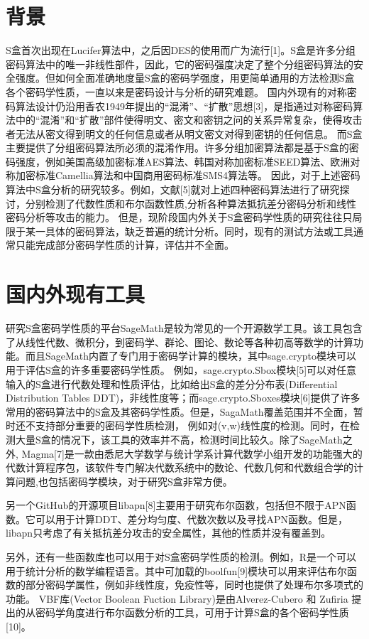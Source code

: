 \documentclass{xduugthesis}
\begin{document}
\section{背景}
S盒首次出现在Lucifer算法中，之后因DES的使用而广为流行[1]。S盒是许多分组密码算法中的唯一非线性部件，因此，它的密码强度决定了整个分组密码算法的安全强度。但如何全面准确地度量S盒的密码学强度，用更简单通用的方法检测S盒各个密码学性质，一直以来是密码设计与分析的研究难题。
国内外现有的对称密码算法设计仍沿用香农1949年提出的“混淆”、“扩散”思想[3]，是指通过对称密码算法中的“混淆”和“扩散”部件使得明文、密文和密钥之问的关系异常复杂，使得攻击者无法从密文得到明文的任何信息或者从明文密文对得到密钥的任何信息。
而S盒主要提供了分组密码算法所必须的混淆作用。许多分组加密算法都是基于S盒的密码强度，例如美国高级加密标准AES算法、韩国对称加密标准SEED算法、欧洲对称加密标准Camellia算法和中国商用密码标准SMS4算法等。
因此，对于上述密码算法中S盒分析的研究较多。例如，文献[5]就对上述四种密码算法进行了研究探讨，分别检测了代数性质和布尔函数性质,分析各种算法抵抗差分密码分析和线性密码分析等攻击的能力。
但是，现阶段国内外关于S盒密码学性质的研究往往只局限于某一具体的密码算法，缺乏普遍的统计分析。同时，现有的测试方法或工具通常只能完成部分密码学性质的计算，评估并不全面。\par
\section{国内外现有工具}
研究S盒密码学性质的平台SageMath是较为常见的一个开源数学工具。该工具包含了从线性代数、微积分，到密码学、群论、图论、数论等各种初高等数学的计算功能。而且SageMath内置了专门用于密码学计算的模块，其中sage.crypto模块可以用于评估S盒的许多重要密码学性质。
例如，sage.crypto.Sbox模块[5]可以对任意输入的S盒进行代数处理和性质评估，比如给出S盒的差分分布表(Differential Distribution Tables DDT)，非线性度等；而sage.crypto.Sboxes模块[6]提供了许多常用的密码算法中的S盒及其密码学性质。但是，SagaMath覆盖范围并不全面，暂时还不支持部分重要的密码学性质检测，
例如对(v,w)线性度的检测。同时，在检测大量S盒的情况下，该工具的效率并不高，检测时间比较久。除了SageMath之外, Magma[7]是一款由悉尼大学数学与统计学系计算代数学小组开发的功能强大的代数计算程序包，该软件专门解决代数系统中的数论、代数几何和代数组合学的计算问题,也包括密码学模块，对于研究S盒非常方便。\par

另一个GitHub的开源项目libapn[8]主要用于研究布尔函数，包括但不限于APN函数。它可以用于计算DDT、差分均匀度、代数次数以及寻找APN函数。但是，libapn只考虑了有关抵抗差分攻击的安全属性，其他的性质并没有覆盖到。\par
另外，还有一些函数库也可以用于对S盒密码学性质的检测。例如，R是一个可以用于统计分析的数学编程语言。其中可加载的boolfun[9]模块可以用来评估布尔函数的部分密码学属性，例如非线性度，免疫性等，同时也提供了处理布尔多项式的功能。
VBF库(Vector Boolean Fuction Library)是由Alverez-Cubero 和 Zufiria 提出的从密码学角度进行布尔函数分析的工具，可用于计算S盒的各个密码学性质[10]。\par
\end{document}
